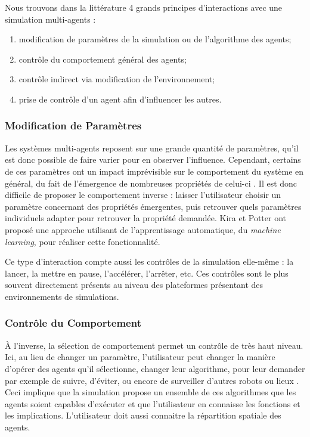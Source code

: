 	
		Nous trouvons dans la littérature 4 grands principes d'interactions avec une simulation multi-agents \cite{kolling_human_2015} :
		\begin{enumerate}
			\item modification de paramètres de la simulation ou de l'algorithme des agents;
			\item contrôle du comportement général des agents;
			\item contrôle indirect via modification de l'environnement;
			\item prise de contrôle d'un agent afin d'influencer les autres.
		\end{enumerate}
		
		
	\subsubsection{Modification de Paramètres}
	Les systèmes multi-agents reposent sur une grande quantité de paramètres, qu'il est donc possible de faire varier pour en observer l'influence. Cependant, certains de ces paramètres ont un impact imprévisible sur le comportement du système en général, du fait de l'émergence de nombreuses propriétés de celui-ci \cite{couzin_collective_2002}. Il est donc difficile de proposer le comportement inverse : laisser l'utilisateur choisir un paramètre concernant des propriétés émergentes, puis retrouver quels paramètres individuels adapter pour retrouver la propriété demandée. Kira et Potter \cite{kira_exerting_2009} ont proposé une approche utilisant de l'apprentissage automatique, du \textit{machine learning}, pour réaliser cette fonctionnalité.
	
	Ce type d'interaction compte aussi les contrôles de la simulation elle-même : la lancer, la mettre en pause, l'accélérer, l'arrêter, etc. Ces contrôles sont le plus souvent directement présents au niveau des plateformes présentant des environnements de simulations.
		
	\subsubsection{Contrôle du Comportement}
	À l'inverse, la sélection de comportement permet un contrôle de très haut niveau. Ici, au lieu de changer un paramètre, l'utilisateur peut changer la manière d'opérer des agents qu'il sélectionne, changer leur algorithme, pour leur demander par exemple de suivre, d'éviter, ou encore de surveiller d'autres robots ou lieux \cite{coppin_controlling_2012}. Ceci implique que la simulation propose un ensemble de ces algorithmes que les agents soient capables d'exécuter et que l'utilisateur en connaisse les fonctions et les implications. L'utilisateur doit aussi connaitre la répartition spatiale des agents.
	
